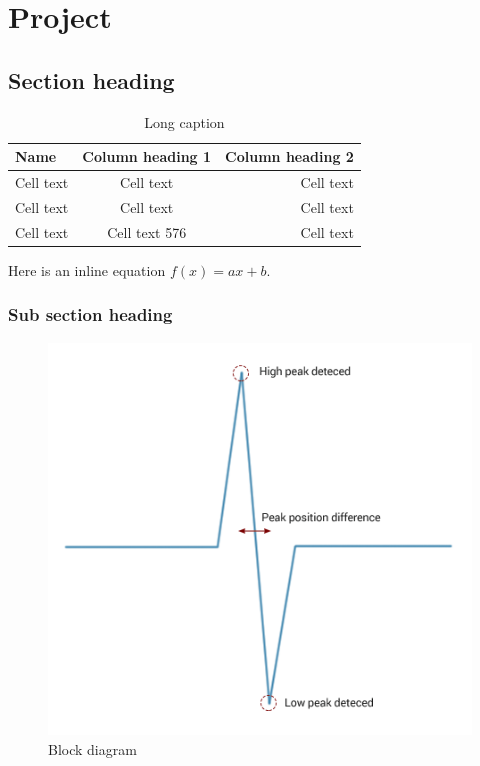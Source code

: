 \graphicspath{{Chapters/Project/}}

\chapter{Project}

\section{Section heading}

\vspace{3 mm} %
\begin{table}[H]
\centering
\sffamily
\small
\begin{tabular}{l | c r}
\toprule
Name 			& Column heading 1 		& Column heading 2	\\
\midrule 
Cell text 	& Cell text					& Cell text			\\ 
Cell text 	& Cell text 				& Cell text 		\\ 
Cell text 	& Cell text 576				& Cell text			\\ 
\bottomrule 
\end{tabular}
\caption[Short caption]{Long caption}
\label{table:table lable}
\end{table}

Here is an inline equation $f(x) = ax+b$.

\subsection{Sub section heading}
\lipsum[1-2] 

\begin{figure}[H]
\centering
\includegraphics[width = 300 pt]{Img/Figures.png}
\caption{Block diagram}
\label{fig:BlockDiagram}
\end{figure}

